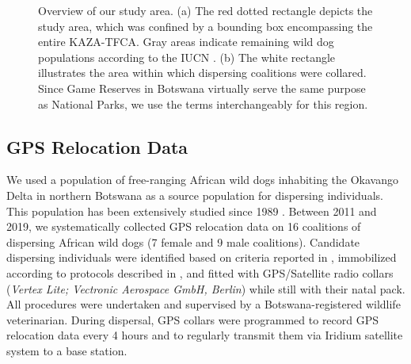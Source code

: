 \documentclass[abstract=on,10pt,a4paper,bibliography=totocnumbered]{article}
\begin{document}
\begin{figure}[h]
  \begin{center}
    \caption{Overview of our study area. (a) The red dotted rectangle depicts
    the study area, which was confined by a bounding box encompassing the entire
    KAZA-TFCA. Gray areas indicate remaining wild dog populations according to
    the IUCN \citep{Woodroffe.2012}. (b) The white rectangle illustrates the
    area within which dispersing coalitions were collared. Since Game Reserves
    in Botswana virtually serve the same purpose as National Parks, we use the
    terms interchangeably for this region.}
    \label{StudyArea}
  \end{center}
\end{figure}

\subsection{GPS Relocation Data}
We used a population of free-ranging African wild dogs inhabiting the Okavango
Delta in northern Botswana as a source population for dispersing individuals.
This population has been extensively studied since 1989 \citep{McNutt.1996,
Cozzi.2013, Cozzi.2020, Behr.2020}. Between 2011 and 2019, we systematically
collected GPS relocation data on 16 coalitions of dispersing African wild dogs
(7 female and 9 male coalitions). Candidate dispersing individuals were
identified based on criteria reported in \cite{Behr.2020}, immobilized according
to protocols described in \cite{Osofsky.1996}, and fitted with GPS/Satellite
radio collars (\textit{Vertex Lite; Vectronic Aerospace GmbH, Berlin}) while
still with their natal pack. All procedures were undertaken and supervised by a
Botswana-registered wildlife veterinarian. During dispersal, GPS collars were
programmed to record GPS relocation data every 4 hours and to regularly transmit
them via Iridium satellite system to a base station.
\end{document}
